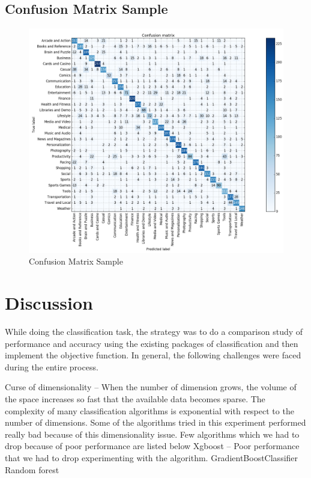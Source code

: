 \documentclass[letterpaper,10pt]{article}
\theoremstyle{mytheor}
\begin{document}
\subsection{Confusion Matrix Sample}

\begin{figure}[H]
\includegraphics[width=\textwidth]{cm}
\centering
\caption{Confusion Matrix Sample}
\label{fig:4}
\end{figure}

\section{Discussion}

While doing the classification task, the strategy was to do a comparison study of performance and accuracy using the existing packages of classification and then implement the objective function. In general, the following challenges were faced during the entire process.

Curse of dimensionality – When the number of dimension grows, the volume of the space increases so fast that the available data becomes sparse. The complexity of many classification algorithms is exponential with respect to the number of dimensions. Some of the algorithms tried in this experiment performed really bad because of this dimensionality issue. Few algorithms which we had to drop because of poor performance are listed below
Xgboost – Poor performance that we had to drop experimenting with the algorithm.
GradientBoostClassifier
Random forest 
\end{document}
